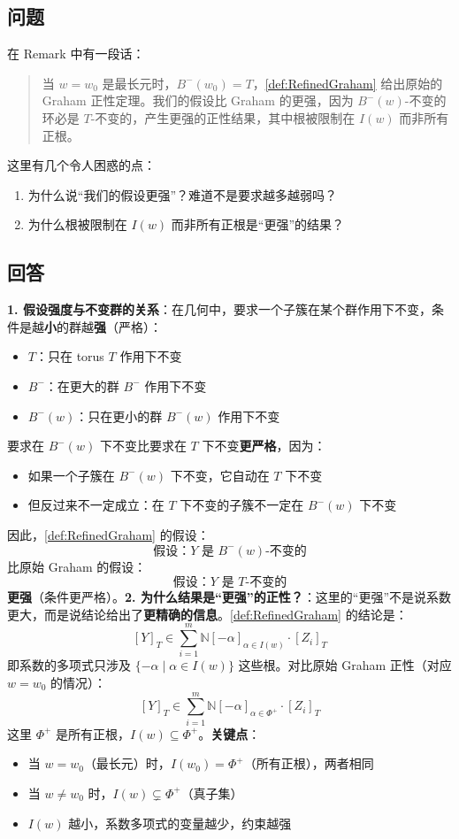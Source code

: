 \subsection{问题}
在 Remark 中有一段话：
\begin{quote}当 $w = w_0$ 是最长元时，$B^-(w_0) = T$，\cref{def:RefinedGraham} 给出原始的 Graham 正性定理。我们的假设比 Graham 的更强，因为 $B^-(w)$-不变的环必是 $T$-不变的，产生更强的正性结果，其中根被限制在 $I(w)$ 而非所有正根。
\end{quote}这里有几个令人困惑的点：
\begin{enumerate}
\item 为什么说``我们的假设更强''？难道不是要求越多越弱吗？\item 为什么根被限制在 $I(w)$ 而非所有正根是``更强''的结果？
\end{enumerate}
\subsection{回答}
\textbf{1. 假设强度与不变群的关系}：在几何中，要求一个子簇在某个群作用下不变，条件是越\textbf{小}的群越\textbf{强}（严格）：
\begin{itemize}
\item \textbf{$T$}：只在 torus $T$ 作用下不变\item \textbf{$B^-$}：在更大的群 $B^-$ 作用下不变\item \textbf{$B^-(w)$}：只在更小的群 $B^-(w)$ 作用下不变
\end{itemize}要求在 $B^-(w)$ 下不变比要求在 $T$ 下不变\textbf{更严格}，因为：
\begin{itemize}
\item 如果一个子簇在 $B^-(w)$ 下不变，它自动在 $T$ 下不变\item 但反过来不一定成立：在 $T$ 下不变的子簇不一定在 $B^-(w)$ 下不变
\end{itemize}因此，\cref{def:RefinedGraham} 的假设：$$\text{假设：} Y \text{ 是 } B^-(w)\text{-不变的}$$比原始 Graham 的假设：$$\text{假设：} Y \text{ 是 } T\text{-不变的}$$\textbf{更强}（条件更严格）。\textbf{2. 为什么结果是``更强''的正性？}：这里的``更强''不是说系数更大，而是说结论给出了\textbf{更精确的信息}。\cref{def:RefinedGraham} 的结论是：$$[Y]_T \in \sum_{i=1}^m \mathbb{N}[-\alpha]_{\alpha \in I(w)} \cdot [Z_i]_T$$即系数的多项式只涉及 $\{-\alpha \mid \alpha \in I(w)\}$ 这些根。对比原始 Graham 正性（对应 $w = w_0$ 的情况）：$$[Y]_T \in \sum_{i=1}^m \mathbb{N}[-\alpha]_{\alpha \in \Phi^+} \cdot [Z_i]_T$$这里 $\Phi^+$ 是所有正根，$I(w) \subseteq \Phi^+$。\textbf{关键点}：
\begin{itemize}
\item 当 $w = w_0$（最长元）时，$I(w_0) = \Phi^+$（所有正根），两者相同\item 当 $w \neq w_0$ 时，$I(w) \subsetneq \Phi^+$（真子集）\item $I(w)$ 越小，系数多项式的变量越少，约束越强
\end{itemize}


